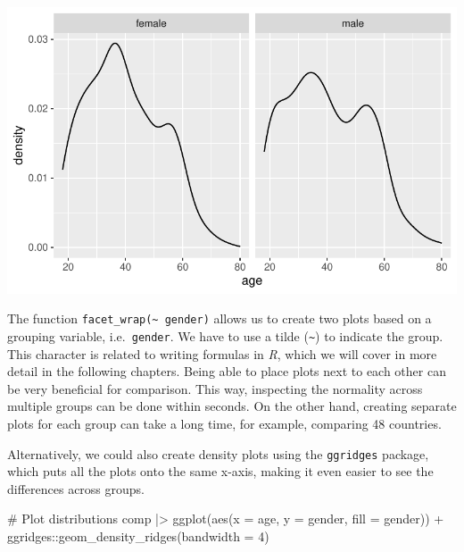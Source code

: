 \documentclass[
  letterpaper,
]{krantz}
\makeatletter
\newenvironment{Shaded}{\begin{snugshade}}{\end{snugshade}}
\newcommand{\AttributeTok}[1]{\textcolor[rgb]{0.40,0.45,0.13}{#1}}
\newcommand{\CommentTok}[1]{\textcolor[rgb]{0.37,0.37,0.37}{#1}}
\newcommand{\DecValTok}[1]{\textcolor[rgb]{0.68,0.00,0.00}{#1}}
\newcommand{\FunctionTok}[1]{\textcolor[rgb]{0.28,0.35,0.67}{#1}}
\newcommand{\NormalTok}[1]{\textcolor[rgb]{0.00,0.23,0.31}{#1}}
\newcommand{\SpecialCharTok}[1]{\textcolor[rgb]{0.37,0.37,0.37}{#1}}
\newenvironment{kframe}{%
\medskip{}
\setlength{\fboxsep}{.8em}
 \def\at@end@of@kframe{}%
 \ifinner\ifhmode%
  \def\at@end@of@kframe{\end{minipage}}%
  \begin{minipage}{\columnwidth}%
 \fi\fi%
 \def\FrameCommand##1{\hskip\@totalleftmargin \hskip-\fboxsep
 \colorbox{shadecolor}{##1}\hskip-\fboxsep
     \hskip-\linewidth \hskip-\@totalleftmargin \hskip\columnwidth}%
 \MakeFramed {\advance\hsize-\width
   \@totalleftmargin\z@ \linewidth\hsize
   \@setminipage}}%
 {\par\unskip\endMakeFramed%
 \at@end@of@kframe}
\renewenvironment{Shaded}{\begin{kframe}}{\end{kframe}}
\makeatother
\begin{document}
\includegraphics{11_group_comparison_files/figure-pdf/comparability-of-egyptians-filter-1.pdf}

The function \texttt{facet\_wrap(\textasciitilde{}\ gender)} allows us
to create two plots based on a grouping variable, i.e.~\texttt{gender}.
We have to use a tilde (\texttt{\textasciitilde{}}) to indicate the
group. This character is related to writing formulas in \emph{R}, which
we will cover in more detail in the following chapters. Being able to
place plots next to each other can be very beneficial for comparison.
This way, inspecting the normality across multiple groups can be done
within seconds. On the other hand, creating separate plots for each
group can take a long time, for example, comparing 48 countries.

Alternatively, we could also create density plots using the
\texttt{ggridges} package, which puts all the plots onto the same
x-axis, making it even easier to see the differences across groups.

\begin{Shaded}
\begin{Highlighting}[]
\CommentTok{\# Plot distributions}
\NormalTok{comp }\SpecialCharTok{|\textgreater{}}
  \FunctionTok{ggplot}\NormalTok{(}\FunctionTok{aes}\NormalTok{(}\AttributeTok{x =}\NormalTok{ age,}
             \AttributeTok{y =}\NormalTok{ gender,}
             \AttributeTok{fill =}\NormalTok{ gender)) }\SpecialCharTok{+}
\NormalTok{  ggridges}\SpecialCharTok{::}\FunctionTok{geom\_density\_ridges}\NormalTok{(}\AttributeTok{bandwidth =} \DecValTok{4}\NormalTok{)}
\end{Highlighting}
\end{Shaded}
\end{document}
